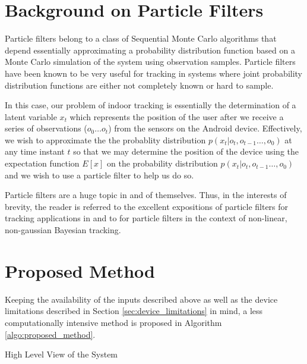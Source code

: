 \section{Background on Particle Filters}
Particle filters belong to a class of Sequential Monte Carlo algorithms 
that depend essentially approximating a probability distribution function based
on a Monte Carlo simulation of the system using observation samples. Particle 
filters have been known to be very useful for tracking in systems where joint
probability distribution functions are either not completely known or hard 
to sample. 

In this case, our problem of indoor tracking is essentially the 
determination of a latent variable $x_t$ which represents the position of the 
user after we receive a series of observations ($o_0 \dots o_t$) from the 
sensors on the Android device. Effectively, we wish to approximate the the 
probablity distribution $p(x_t|o_t,o_{t-1}\dots,o_0)$ at any time instant $t$
so that we may determine the position of the device using the expectation 
function $E[x]$ on the probability distribution $p(x_t|o_t,o_{t-1}\dots,o_0)$
and we wish to use a particle filter to help us do so.

Particle filters are a huge topic in and of themselves. Thus, in the interests
of brevity, the reader is referred to the excellent expositions of particle 
filters for tracking applications in \cite{Ristic} and to \cite{Arulampalam}
for particle filters in the context of non-linear, non-gaussian Bayesian
tracking.


\section{Proposed Method}

Keeping the availability of the inputs described above as well as the device 
limitations described in Section \ref{sec:device_limitations} in mind, a less 
computationally intensive method is proposed in 
Algorithm \ref{algo:proposed_method}.

\begin{algorithm}
\dontprintsemicolon
{}
\caption{High Level View of the System\label{algo:proposed_method}}
\end{algorithm}

